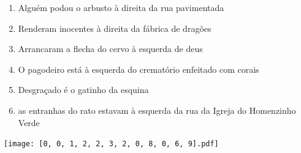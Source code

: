 \documentclass[12pt]{article}
\begin{document}
		 

\pagebreak


	\begin{enumerate}
		  \sffamily %
		  \large %


\vfill \item
Alguém podou o arbusto	%
à direita
da rua pavimentada	%

\vfill \item
Renderam inocentes	%
à direita
da fábrica de dragões	%

\vfill \item
Arrancaram a flecha do cervo	%
à esquerda
de deus	%

\vfill \item
O pagodeiro está	%
à esquerda
do crematório enfeitado com corais	%

\vfill \item
Desgraçado é	%
o gatinho da esquina	%

\vfill \item
as entranhas do rato estavam	%
à esquerda
da rua da Igreja do Homenzinho Verde	%
	\end{enumerate}
		  
		  \hfill

		  \vfill

\texttt{[image: [0, 0, 1, 2, 2, 3, 2, 0, 8, 0, 6, 9].pdf]}


	\hfill	  	  


\pagebreak			
\end{document}
